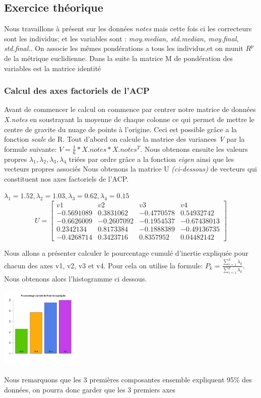 \documentclass[10pt]{article}
\begin{document}
	\subsection{Exercice théorique}
	Nous travaillons à présent sur les données \textit{notes} mais cette fois ci les correcteurs sont les individus; et les variables sont : \textit{moy.median, std.median, moy.final, std.final.}. On associe les mêmes pondérations a tous les individus,et on munit $R^{p}$ de la métrique euclidienne. Dans la suite la matrice M de pondération des variables est la matrice identité
	\subsubsection{Calcul des axes factoriels de l'ACP}
	Avant de commencer le calcul on commence par centrer notre matrice de données \textit{X.notes} en soustrayant la moyenne de chaque colonne ce qui permet de mettre le centre de gravite du nuage de points à l'origine. Ceci est possible grâce a la fonction \textit{scale} de R. Tout d'abord on calcule la matrice des variances \textit{V} par la formule suivante: $V = \frac{1}{6}* X.notes* X.notes^{T}$. Nous obtenons ensuite les valeurs propres $\lambda_{1}, \lambda_{2}, \lambda_{3}, \lambda_{4}$ triées par ordre grâce a la fonction \textit{eigen} ainsi que les vecteurs propres associés Nous obtenons la matrice U \textit{(ci-dessous)} de vecteurs qui constituent nos axes factoriels de l'ACP.
	
	\begin{center}
		$\lambda_{1}=	1.52 , \lambda_{2}= 1.03, \lambda_{3}= 0.62 , \lambda_{4}= 0.15$
		\[
		U=
		\begin{bmatrix}
		v1	& v2	& v3 &	v4\\
		-0.5691089	& 0.3831062	& -0.4770578 &	0.54932742\\
		-0.6626009	& -0.2607092 &	-0.1954537  &	-0.67438013\\
		0.2342134 & 	0.8173384	&  -0.1888389 & 	-0.49136735\\
		-0.4268714 &	0.3423716 &	0.8357952 &	0.04482142
		\end{bmatrix}
		\]
	\end{center}
	Nous allons a présenter calculer le pourcentage cumulé d'inertie expliquée pour chacun des axes v1, v2, v3 et v4. Pour cela on utilise la formule: $P_{k}= \frac{\sum_{i=1}^{k} \lambda_{k}}{\sum_{i=1}^{p} \lambda_{k}}$. Nous obtenons alors l'histogramme ci dessous.
	\begin{center}
		\includegraphics[width=39mm]{Figures/Notes_PCA/pourcentage_inertie.png}
		\label{fig:boxplot_crabs_quantitatives}
	\end{center}	
Nous remarquons que les 3 premières composantes ensemble expliquent  95\%  des données, on pourra donc garder que les 3 premiers axes
	
\end{document}
